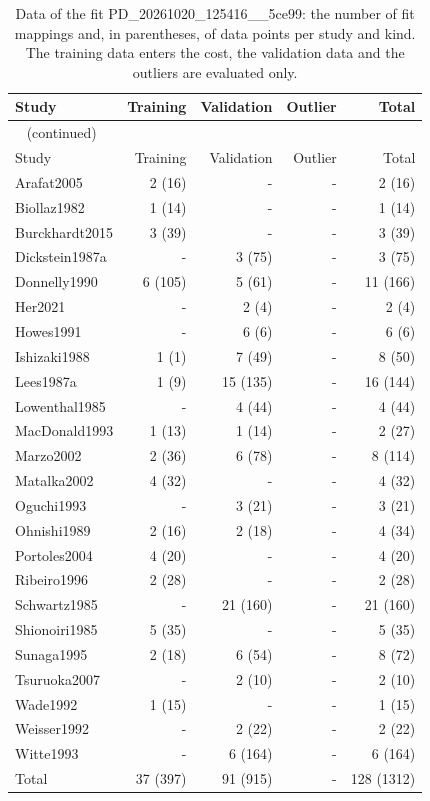 \begin{longtable}{lrrrr}
\caption{Data of the fit PD\_20261020\_125416\_\_5ce99: the number of fit mappings and, in parentheses, of data points per study and kind. The training data enters the cost, the validation data and the outliers are evaluated only.}\label{tab:data:PD_20261020_125416__5ce99} \\
\toprule
Study & Training & Validation & Outlier & Total \\
\midrule
\endfirsthead
\multicolumn{5}{l}{\small\tablename~\thetable{} (continued)} \\
\toprule
Study & Training & Validation & Outlier & Total \\
\midrule
\endhead
\bottomrule
\endlastfoot
Arafat2005 & 2 (16) & - & - & 2 (16) \\
Biollaz1982 & 1 (14) & - & - & 1 (14) \\
Burckhardt2015 & 3 (39) & - & - & 3 (39) \\
Dickstein1987a & - & 3 (75) & - & 3 (75) \\
Donnelly1990 & 6 (105) & 5 (61) & - & 11 (166) \\
Her2021 & - & 2 (4) & - & 2 (4) \\
Howes1991 & - & 6 (6) & - & 6 (6) \\
Ishizaki1988 & 1 (1) & 7 (49) & - & 8 (50) \\
Lees1987a & 1 (9) & 15 (135) & - & 16 (144) \\
Lowenthal1985 & - & 4 (44) & - & 4 (44) \\
MacDonald1993 & 1 (13) & 1 (14) & - & 2 (27) \\
Marzo2002 & 2 (36) & 6 (78) & - & 8 (114) \\
Matalka2002 & 4 (32) & - & - & 4 (32) \\
Oguchi1993 & - & 3 (21) & - & 3 (21) \\
Ohnishi1989 & 2 (16) & 2 (18) & - & 4 (34) \\
Portoles2004 & 4 (20) & - & - & 4 (20) \\
Ribeiro1996 & 2 (28) & - & - & 2 (28) \\
Schwartz1985 & - & 21 (160) & - & 21 (160) \\
Shionoiri1985 & 5 (35) & - & - & 5 (35) \\
Sunaga1995 & 2 (18) & 6 (54) & - & 8 (72) \\
Tsuruoka2007 & - & 2 (10) & - & 2 (10) \\
Wade1992 & 1 (15) & - & - & 1 (15) \\
Weisser1992 & - & 2 (22) & - & 2 (22) \\
Witte1993 & - & 6 (164) & - & 6 (164) \\
Total & 37 (397) & 91 (915) & - & 128 (1312) \\
\end{longtable}

